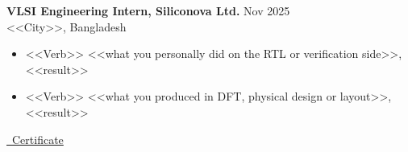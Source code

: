 \vspace{5pt}

\textbf{VLSI Engineering Intern, Siliconova Ltd.} \hfill Nov 2025\\
<<City>>, Bangladesh
\begin{itemize}
  \item <<Verb>> <<what you personally did on the RTL or verification side>>, <<result>>
  \item <<Verb>> <<what you produced in DFT, physical design or layout>>, <<result>>
\end{itemize}
\href{https://drive.google.com/file/d/16FEPvnWIKaB9XMFpjI0BC0aNkjKeaeZY/view}{\faCertificate\ Certificate}

%
%
%
